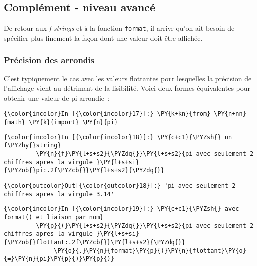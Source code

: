     \hypertarget{compluxe9ment---niveau-avancuxe9}{%
\subsection{Complément - niveau
avancé}\label{compluxe9ment---niveau-avancuxe9}}

    De retour aux \emph{f-strings} et à la fonction \texttt{format}, il
arrive qu'on ait besoin de spécifier plus finement la façon dont une
valeur doit être affichée.

    \hypertarget{pruxe9cision-des-arrondis}{%
\subsubsection{Précision des arrondis}\label{pruxe9cision-des-arrondis}}

    C'est typiquement le cas avec les valeurs flottantes pour lesquelles la
précision de l'affichage vient au détriment de la lisibilité. Voici deux
formes équivalentes pour obtenir une valeur de pi arrondie~:

    \begin{Verbatim}[commandchars=\\\{\},frame=single,framerule=0.3mm,rulecolor=\color{cellframecolor}]
{\color{incolor}In [{\color{incolor}17}]:} \PY{k+kn}{from} \PY{n+nn}{math} \PY{k}{import} \PY{n}{pi}
\end{Verbatim}


    \begin{Verbatim}[commandchars=\\\{\},frame=single,framerule=0.3mm,rulecolor=\color{cellframecolor}]
{\color{incolor}In [{\color{incolor}18}]:} \PY{c+c1}{\PYZsh{} un f\PYZhy{}string}
         \PY{n}{f}\PY{l+s+s2}{\PYZdq{}}\PY{l+s+s2}{pi avec seulement 2 chiffres apres la virgule }\PY{l+s+si}{\PYZob{}pi:.2f\PYZcb{}}\PY{l+s+s2}{\PYZdq{}}
\end{Verbatim}


\begin{Verbatim}[commandchars=\\\{\},frame=single,framerule=0.3mm,rulecolor=\color{cellframecolor}]
{\color{outcolor}Out[{\color{outcolor}18}]:} 'pi avec seulement 2 chiffres apres la virgule 3.14'
\end{Verbatim}
            
    \begin{Verbatim}[commandchars=\\\{\},frame=single,framerule=0.3mm,rulecolor=\color{cellframecolor}]
{\color{incolor}In [{\color{incolor}19}]:} \PY{c+c1}{\PYZsh{} avec format() et liaison par nom}
         \PY{p}{(}\PY{l+s+s2}{\PYZdq{}}\PY{l+s+s2}{pi avec seulement 2 chiffres apres la virgule }\PY{l+s+si}{\PYZob{}flottant:.2f\PYZcb{}}\PY{l+s+s2}{\PYZdq{}}
              \PY{o}{.}\PY{n}{format}\PY{p}{(}\PY{n}{flottant}\PY{o}{=}\PY{n}{pi}\PY{p}{)}\PY{p}{)}
\end{Verbatim}


